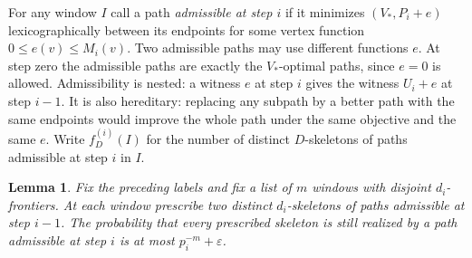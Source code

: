\documentclass[11pt]{article}
\newtheorem{lemma}[theorem]{Lemma}
\begin{document}
For any window $I$ call a path \emph{admissible at step $i$} if it
minimizes $(V_*,P_i+e)$ lexicographically between its endpoints for
some vertex function $0\le e(v)\le M_i(v)$. Two admissible paths
may use different functions $e$. At step zero the admissible paths are
exactly the $V_*$-optimal paths, since $e=0$ is allowed. Admissibility
is nested: a witness $e$ at step $i$ gives the witness $U_i+e$ at step
$i-1$. It is also hereditary: replacing any subpath by a better path
with the same endpoints would improve the whole path under the same
objective and the same $e$. Write $f_D^{(i)}(I)$ for the number of
distinct $D$-skeletons of paths admissible at step $i$ in $I$.

\begin{lemma}\label{lem:packed-ties}
Fix the preceding labels and fix a list of $m$ windows with disjoint
$d_i$-frontiers. At each window prescribe two distinct $d_i$-skeletons
of paths admissible at step $i-1$. The probability that every prescribed
skeleton is still realized by a path admissible at step $i$ is at most
$p_i^{-m}+\varepsilon$.
\end{lemma}
\end{document}
